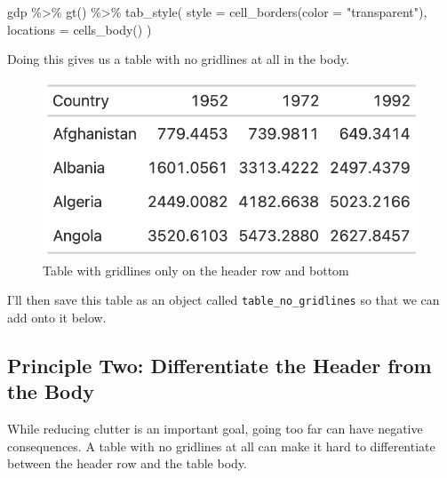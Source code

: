 \documentclass[
]{book}
\newenvironment{Shaded}{\begin{snugshade}}{\end{snugshade}}
\newcommand{\AttributeTok}[1]{\textcolor[rgb]{0.77,0.63,0.00}{#1}}
\newcommand{\FunctionTok}[1]{\textcolor[rgb]{0.00,0.00,0.00}{#1}}
\newcommand{\NormalTok}[1]{#1}
\newcommand{\SpecialCharTok}[1]{\textcolor[rgb]{0.00,0.00,0.00}{#1}}
\newcommand{\StringTok}[1]{\textcolor[rgb]{0.31,0.60,0.02}{#1}}
\begin{document}
\begin{Shaded}
\begin{Highlighting}[]
\NormalTok{gdp }\SpecialCharTok{\%\textgreater{}\%} 
  \FunctionTok{gt}\NormalTok{() }\SpecialCharTok{\%\textgreater{}\%} 
  \FunctionTok{tab\_style}\NormalTok{(}
    \AttributeTok{style =} \FunctionTok{cell\_borders}\NormalTok{(}\AttributeTok{color =} \StringTok{"transparent"}\NormalTok{),}
    \AttributeTok{locations =} \FunctionTok{cells\_body}\NormalTok{()}
\NormalTok{  )}
\end{Highlighting}
\end{Shaded}

Doing this gives us a table with no gridlines at all in the body.

\begin{figure}
\includegraphics[width=1\linewidth]{nostarch/temp/F05003} \caption{Table with gridlines only on the header row and bottom}\label{fig:unnamed-chunk-11}
\end{figure}

I'll then save this table as an object called \texttt{table\_no\_gridlines} so that we can add onto it below.

\hypertarget{principle-two-differentiate-the-header-from-the-body}{%
\subsection*{Principle Two: Differentiate the Header from the Body}\label{principle-two-differentiate-the-header-from-the-body}}

While reducing clutter is an important goal, going too far can have negative consequences. A table with no gridlines at all can make it hard to differentiate between the header row and the table body.
\end{document}
